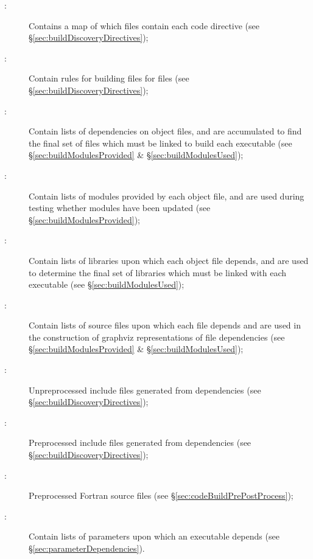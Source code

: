 \begin{description}
\item[:] Contains a map of which files contain each code directive (see \S\ref{sec:buildDiscoveryDirectives});

\item[:] Contain rules for building files for  files (see \S\ref{sec:buildDiscoveryDirectives});

\item[:] Contain lists of dependencies on object files, and are accumulated to find the final set of files which must be linked to build each executable (see \S\ref{sec:buildModulesProvided} \& \S\ref{sec:buildModulesUsed});

\item[:] Contain lists of modules provided by each object file, and are used during testing whether modules have been updated (see \S\ref{sec:buildModulesProvided});

\item[:] Contain lists of libraries upon which each object file depends, and are used to determine the final set of libraries which must be linked with each executable (see \S\ref{sec:buildModulesUsed});

\item[:] Contain lists of source files upon which each file depends and are used in the construction of \gls{graphviz} representations of file dependencies (see \S\ref{sec:buildModulesProvided} \& \S\ref{sec:buildModulesUsed});

\item[:] Unpreprocessed include files generated from  dependencies (see \S\ref{sec:buildDiscoveryDirectives});

\item[:] Preprocessed include files generated from  dependencies (see \S\ref{sec:buildDiscoveryDirectives});

\item[:] Preprocessed Fortran source files (see \S\ref{sec:codeBuildPrePostProcess});

\item[:] Contain lists of parameters upon which an executable depends (see \S\ref{sec:parameterDependencies}).
\end{description}

